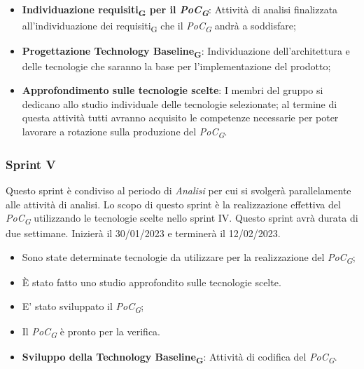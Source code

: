 \:
\begin{itemize}
	\item \textbf{Individuazione requisiti\textsubscript{G} per il \textit{PoC\textsubscript{G}}}: Attività di analisi finalizzata all’individuazione dei requisiti\textsubscript{G} che il \textit{PoC\textsubscript{G}} andrà a soddisfare;
    \item \textbf{Progettazione Technology Baseline\textsubscript{G}}: Individuazione dell’architettura e delle tecnologie che saranno la base per l’implementazione del prodotto;
    \item \textbf{Approfondimento sulle tecnologie scelte}: I membri del gruppo si dedicano allo studio individuale delle tecnologie selezionate; al termine di questa attività tutti avranno acquisito le competenze necessarie per poter lavorare a rotazione sulla produzione del \textit{PoC\textsubscript{G}}.
\end{itemize}

\subsubsection{Sprint V}
Questo sprint è condiviso al periodo di \textit{Analisi} per cui si svolgerà parallelamente alle attività di analisi. 
Lo scopo di questo sprint è la realizzazione effettiva del \textit{PoC\textsubscript{G}} utilizzando le tecnologie scelte nello sprint IV.
Questo sprint avrà durata di due settimane. Inizierà il 30/01/2023 e terminerà il 12/02/2023.

\:
\begin{itemize}
	\item Sono state determinate tecnologie da utilizzare per la realizzazione del \textit{PoC\textsubscript{G}};
	\item È stato fatto uno studio approfondito sulle tecnologie scelte.
\end{itemize}

\:
\begin{itemize}
	\item E' stato sviluppato il \textit{PoC\textsubscript{G}};
	\item Il \textit{PoC\textsubscript{G}} è pronto per la verifica.
\end{itemize}

\:
\begin{itemize}
    \item \textbf{Sviluppo della Technology Baseline\textsubscript{G}}: Attività di codifica del \textit{PoC\textsubscript{G}}.
\end{itemize}

